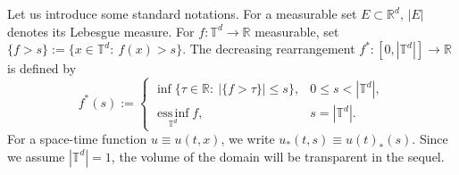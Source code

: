 \documentclass[11pt]{article}
\numberwithin{equation}{section} %
\newcommand{\R}{{\mathbb{R}}}
\newcommand{\T}{{\mathbb{T}}}
\begin{document}
Let us introduce some standard notations. For a measurable set $E\subset\R^d$, $|E|$ denotes its Lebesgue measure. For $f:\T^d\to\R$ measurable, set $\{f>s\}:=\{x\in\T^d:\ f(x)>s\}$. The decreasing rearrangement $f^*:[0,|\T^d|]\to\R$ is defined by
$$
 f^{*}(s):=
 \begin{cases}
 \inf\{\tau\in\R:\ |\{f>\tau\}|\le s\}, & 0\le s<|\T^d|,\\
 \operatorname*{ess\,inf}_{\T^d} f, & s=|\T^d|.
 \end{cases}
$$
For a space-time function $u\equiv u(t,x)$, we write $u_*(t,s) \equiv u(t)_*(s)$. Since we assume $|\T^d|=1$, the volume of the domain will be transparent in the sequel.

\end{document}
